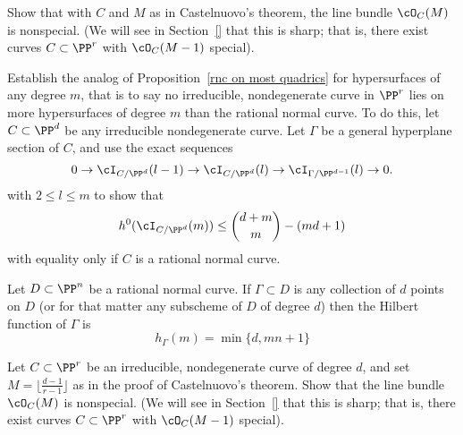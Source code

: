 \begin{exercise}
Show that with $C$ and $M$ as in Castelnuovo's theorem, the line bundle $\cO_C(M)$ is nonspecial. (We will see in Section~\ref{} that this is sharp; that is, there exist curves $C \subset \PP^r$ with $\cO_C(M-1)$ special).
\end{exercise}

\begin{exercise}\label{extremal m-ics}
Establish the analog of Proposition~\ref{rnc on most quadrics} for hypersurfaces of any degree $m$, that is to say no irreducible, nondegenerate curve in $\PP^r$ lies on more hypersurfaces of degree $m$ than the rational normal curve.
To do this, let $C\subset \PP^d$ be any irreducible nondegenerate curve. Let $\Gamma$ be a general hyperplane section
of $C$, and use the exact sequences
$$
0 \to \cI_{C/\PP^d}(l-1) \to \cI_{C/\PP^d}(l) \to \cI_{\Gamma/\PP^{d-1}}(l) \to 0.
$$ 
with $2 \leq l \leq m$ to show that
$$
h^0(\cI_{C/\PP^d}(m)) \leq  \binom{d+m}{m} - (md+1)
$$
with equality only if $C$ is a rational normal curve.
\end{exercise}

\begin{exercise}\label{linear bound is sharp}
Let $D \subset \PP^n$ be a rational normal curve. If $\Gamma \subset D$ is any collection of $d$ points on $D$ (or for that matter any subscheme of $D$ of degree $d$) then the Hilbert function of $\Gamma$ is
$$
h_\Gamma(m) = \min\{d, mn+1\}
$$
\end{exercise} 

\begin{exercise}
Let $C \subset \PP^r$ be an irreducible, nondegenerate curve of degree $d$, and set $M = \lfloor{\frac{d-1}{r-1}}\rfloor$ as in the proof of Castelnuovo's theorem.
Show that the line bundle $\cO_C(M)$ is nonspecial. (We will see in Section~\ref{} that this is sharp; that is, there exist curves $C \subset \PP^r$ with $\cO_C(M-1)$ special).
\end{exercise}

